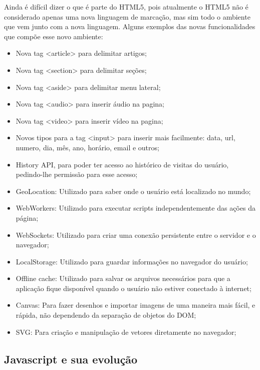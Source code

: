 Ainda é difícil dizer o que é parte do HTML5, pois atualmente o HTML5
não é considerado apenas uma nova linguagem de marcação, mas sim todo
o ambiente que vem junto com a nova linguagem. Alguns exemplos das novas
funcionalidades que compõe esse novo ambiente:
\begin{itemize}
  \item Nova tag <article> para delimitar artigos;
  \item Nova tag <section> para delimitar seções;
  \item Nova tag <aside> para delimitar menu lateral;
  \item Nova tag <audio> para inserir áudio na pagina;
  \item Nova tag <video> para inserir vídeo na pagina;
  \item Novos tipos para a tag <input> para inserir mais facilmente:
  data, url, numero, dia, mês, ano, horário, email e outros;
  \item History API, para poder ter acesso ao histórico de visitas do
  usuário, pedindo-lhe permissão para esse acesso;
  \item GeoLocation: Utilizado para saber onde o usuário está localizado no
  mundo;
  \item WebWorkers: Utilizado para executar scripts independentemente das ações
  da página;
  \item WebSockets: Utilizado para criar uma conexão persistente entre
  o servidor e o navegador;
  \item LocalStorage: Utilizado para guardar informações no navegador
  do usuário;
  \item Offline cache: Utilizado para salvar os arquivos necessários
  para que a aplicação fique disponível quando o usuário não estiver
  conectado à internet;
  \item Canvas: Para fazer desenhos e importar imagens de uma maneira
  mais fácil, e rápida, não dependendo da separação de objetos do DOM;
  \item SVG: Para criação e manipulação de vetores diretamente no
  navegador;
\end{itemize}

\subsection{Javascript e sua evolução}

